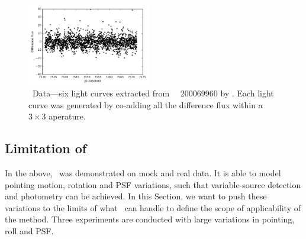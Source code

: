 \begin{figure}[p]
\begin{center}
\includegraphics[width=0.48\textwidth]{figures/cdi/f6f}
\end{center}
\caption{
  \label{lightcurve}
  \KTCN\ Data---six light curves extracted from \KTCN\ \epic\ 200069960 by \cpmdiff. 
  Each light curve was generated by co-adding all the difference flux within a $3\times 3$ aperature.
}
\end{figure}


\subsection{Limitation of \cpmdiff}\label{limits}
In the above,  \cpmdiff\ was demonstrated on mock and real data. 
It is able to model pointing motion, rotation and PSF variations, such that variable-source detection and photometry can be achieved.
In this Section, we want to push these variations to the limits of what \cpmdiff\ can handle to define the scope of applicability of the method. 
Three experiments are conducted with large variations in pointing, roll and PSF.

